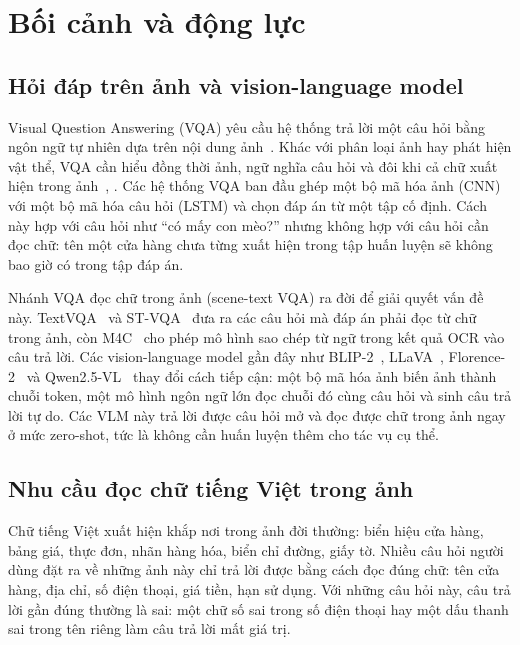 \section{Bối cảnh và động lực}
\label{sec:intro-background}

\subsection{Hỏi đáp trên ảnh và vision-language model}

Visual Question Answering (VQA) yêu cầu hệ thống trả lời một câu hỏi bằng ngôn
ngữ tự nhiên dựa trên nội dung ảnh~\cite{antol2015vqa}. Khác với phân loại ảnh
hay phát hiện vật thể, VQA cần hiểu đồng thời ảnh, ngữ nghĩa câu hỏi và đôi khi
cả chữ xuất hiện trong ảnh~\cite{singh2019textvqa}, \cite{biten2019stvqa}. Các hệ thống
VQA ban đầu ghép một bộ mã hóa ảnh (CNN) với một bộ mã hóa câu hỏi (LSTM) và
chọn đáp án từ một tập cố định. Cách này hợp với câu hỏi như ``có mấy con mèo?''
nhưng không hợp với câu hỏi cần đọc chữ: tên một cửa hàng chưa từng xuất hiện
trong tập huấn luyện sẽ không bao giờ có trong tập đáp án.

Nhánh VQA đọc chữ trong ảnh (scene-text VQA) ra đời để giải quyết vấn đề này.
TextVQA~\cite{singh2019textvqa} và ST-VQA~\cite{biten2019stvqa} đưa ra các câu
hỏi mà đáp án phải đọc từ chữ trong ảnh, còn M4C~\cite{hu2020m4c} cho phép mô
hình sao chép từ ngữ trong kết quả OCR vào câu trả lời. Các vision-language model
gần đây như BLIP-2~\cite{li2023blip2}, LLaVA~\cite{liu2023llava},
Florence-2~\cite{xiao2024florence2} và Qwen2.5-VL~\cite{bai2025qwen25vl} thay đổi
cách tiếp cận: một bộ mã hóa ảnh biến ảnh thành chuỗi token, một mô hình ngôn ngữ
lớn đọc chuỗi đó cùng câu hỏi và sinh câu trả lời tự do. Các VLM này trả lời được
câu hỏi mở và đọc được chữ trong ảnh ngay ở mức zero-shot, tức là không cần huấn
luyện thêm cho tác vụ cụ thể.

\subsection{Nhu cầu đọc chữ tiếng Việt trong ảnh}

Chữ tiếng Việt xuất hiện khắp nơi trong ảnh đời thường: biển hiệu cửa hàng, bảng
giá, thực đơn, nhãn hàng hóa, biển chỉ đường, giấy tờ. Nhiều câu hỏi người dùng
đặt ra về những ảnh này chỉ trả lời được bằng cách đọc đúng chữ: tên cửa hàng,
địa chỉ, số điện thoại, giá tiền, hạn sử dụng. Với những câu hỏi này, câu trả lời
gần đúng thường là sai: một chữ số sai trong số điện thoại hay một dấu thanh sai
trong tên riêng làm câu trả lời mất giá trị.


